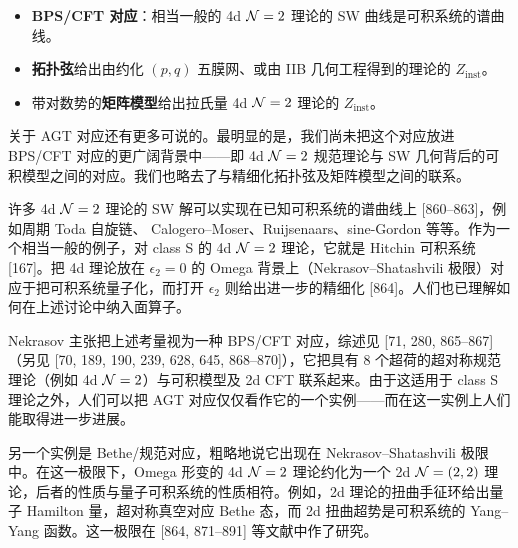 \begin{tcolorbox}[colback=black!5,colframe=black!55,boxrule=0.6pt,arc=2pt,
  left=6pt,right=6pt,top=4pt,bottom=4pt,fontupper=\small]
\begin{itemize}[leftmargin=1.4em,itemsep=1pt,topsep=1pt]
  \item \textbf{BPS/CFT 对应}：相当一般的 4d $\mathcal{N}=2$ 理论的 SW 曲线是可积系统的谱曲线。
  \item \textbf{拓扑弦}给出由约化 $(p,q)$ 五膜网、或由 IIB 几何工程得到的理论的 $Z_{\text{inst}}$。
  \item 带对数势的\textbf{矩阵模型}给出拉氏量 4d $\mathcal{N}=2$ 理论的 $Z_{\text{inst}}$。
\end{itemize}
\end{tcolorbox}

关于 AGT 对应还有更多可说的。最明显的是，我们尚未把这个对应放进 BPS/CFT 对应的更广阔背景中------即 4d $\mathcal{N}=2$ 规范理论与 SW 几何背后的可积模型之间的对应。我们也略去了与精细化拓扑弦及矩阵模型之间的联系。

许多 4d $\mathcal{N}=2$ 理论的 SW 解可以实现在已知可积系统的谱曲线上 [860--863]，例如周期 Toda 自旋链、
Calogero--Moser、Ruijsenaars、sine-Gordon 等等。作为一个相当一般的例子，对 class S 的 4d $\mathcal{N}=2$ 理论，它就是 Hitchin 可积系统 [167]。把 4d 理论放在 $\epsilon_2=0$ 的 Omega 背景上（Nekrasov--Shatashvili 极限）对应于把可积系统量子化，而打开 $\epsilon_2$ 则给出进一步的精细化 [864]。人们也已理解如何在上述讨论中纳入面算子。

Nekrasov 主张把上述考量视为一种 BPS/CFT 对应，综述见 [71, 280, 865--867]（另见 [70, 189, 190, 239, 628, 645, 868--870]），它把具有 8 个超荷的超对称规范理论（例如 4d $\mathcal{N}=2$）与可积模型及 2d CFT 联系起来。由于这适用于 class S 理论之外，人们可以把 AGT 对应仅仅看作它的一个实例------而在这一实例上人们能取得进一步进展。

另一个实例是 Bethe/规范对应，粗略地说它出现在 Nekrasov--Shatashvili 极限中。在这一极限下，Omega 形变的 4d $\mathcal{N}=2$ 理论约化为一个 2d $\mathcal{N}=(2,2)$ 理论，后者的性质与量子可积系统的性质相符。例如，2d 理论的扭曲手征环给出量子 Hamilton 量，超对称真空对应 Bethe 态，而 2d 扭曲超势是可积系统的 Yang--Yang 函数。这一极限在 [864, 871--891] 等文献中作了研究。

